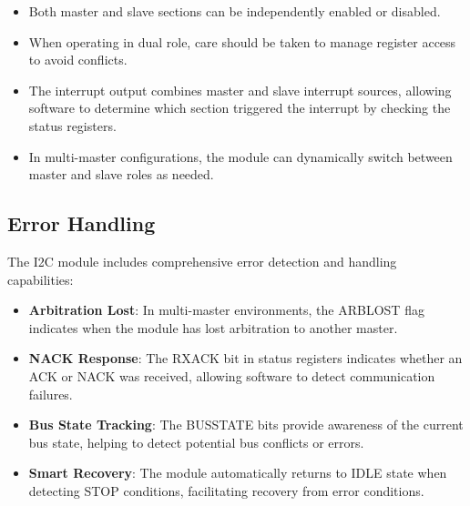 \begin{itemize}
    \item Both master and slave sections can be independently enabled or disabled.
    
    \item When operating in dual role, care should be taken to manage register access to avoid conflicts.
    
    \item The interrupt output combines master and slave interrupt sources, allowing software to determine which section triggered the interrupt by checking the status registers.
    
    \item In multi-master configurations, the module can dynamically switch between master and slave roles as needed.
\end{itemize}

\subsection{Error Handling}
The I2C module includes comprehensive error detection and handling capabilities:

\begin{itemize}
    \item \textbf{Arbitration Lost}: In multi-master environments, the ARBLOST flag indicates when the module has lost arbitration to another master.
    
    \item \textbf{NACK Response}: The RXACK bit in status registers indicates whether an ACK or NACK was received, allowing software to detect communication failures.
    
    \item \textbf{Bus State Tracking}: The BUSSTATE bits provide awareness of the current bus state, helping to detect potential bus conflicts or errors.
    
    \item \textbf{Smart Recovery}: The module automatically returns to IDLE state when detecting STOP conditions, facilitating recovery from error conditions.
\end{itemize}